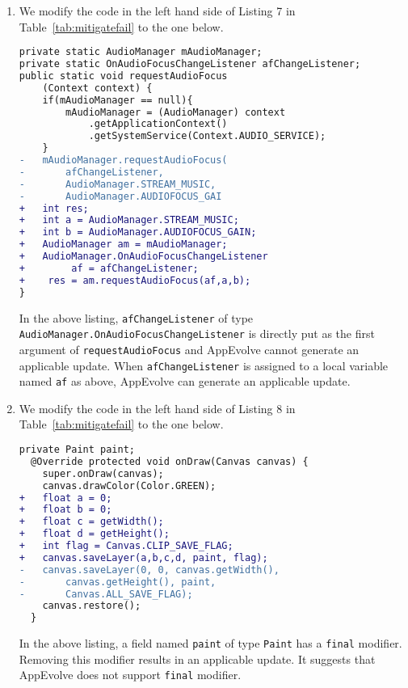 \begin{enumerate}
\item We modify the code in the left hand side of Listing 7 in Table~\ref{tab:mitigatefail} to the one below.
\begin{lstlisting}[language=diff,numbers=none]
private static AudioManager mAudioManager;
private static OnAudioFocusChangeListener afChangeListener;
public static void requestAudioFocus
    (Context context) {
    if(mAudioManager == null){
        mAudioManager = (AudioManager) context
            .getApplicationContext()
            .getSystemService(Context.AUDIO_SERVICE);
    }
-   mAudioManager.requestAudioFocus(
-       afChangeListener,
-       AudioManager.STREAM_MUSIC,
-       AudioManager.AUDIOFOCUS_GAI
+   int res;
+   int a = AudioManager.STREAM_MUSIC;
+   int b = AudioManager.AUDIOFOCUS_GAIN;
+   AudioManager am = mAudioManager;
+   AudioManager.OnAudioFocusChangeListener
+        af = afChangeListener;
+    res = am.requestAudioFocus(af,a,b);
}
\end{lstlisting}
In the above listing, {\tt afChangeListener} of type {\tt AudioManager.OnAudioFocusChangeListener} is directly put as the first argument of {\tt requestAudioFocus} and AppEvolve cannot generate an applicable update. When {\tt afChangeListener} is assigned to a local variable named {\tt af} as above, AppEvolve can generate an applicable update.

\item We modify the code in the left hand side of Listing 8 in Table~\ref{tab:mitigatefail} to the one below.
\begin{lstlisting}[language=diff,numbers=none]
private Paint paint;
  @Override protected void onDraw(Canvas canvas) {
    super.onDraw(canvas);
    canvas.drawColor(Color.GREEN);
+   float a = 0;
+   float b = 0;
+   float c = getWidth();
+   float d = getHeight();
+   int flag = Canvas.CLIP_SAVE_FLAG;
+   canvas.saveLayer(a,b,c,d, paint, flag);
-   canvas.saveLayer(0, 0, canvas.getWidth(),
-       canvas.getHeight(), paint,
-       Canvas.ALL_SAVE_FLAG);
    canvas.restore();
  }
\end{lstlisting}
In the above listing, a field named {\tt paint} of type {\tt Paint} has a {\tt final} modifier. Removing this modifier results in an applicable update. It suggests that AppEvolve does not support {\tt final} modifier.
\end{enumerate}


